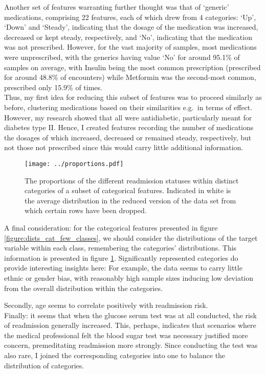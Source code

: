 \documentclass[10pt, twoside, a4paper]{article}
\begin{document}
	Another set of features warranting further thought was that of `generic' medications,
	comprising 22 features, each of which drew from 4 categories:
	`Up', `Down' and `Steady', indicating that the dosage of the medication was increased, 
	decreased or kept steady, respectively, and `No', indicating 
	that the medication was not prescribed. However, for
	the vast majority of samples, most medications were unprescribed, with the generics 
	having value `No' for around 95.1\% of samples on average, with Insulin being the most 
	common prescription (prescribed for around 48.8\% of encounters) while Metformin was 
	the second-most common, prescribed only 15.9\% of times. \\
	Thus, my first idea for reducing this subset of features was to proceed similarly 
	as before, clustering medications based on their similarities e.g.\ in terms of effect. 
	However, my research showed that all were antidiabetic, particularly meant for diabetes type II. 
	Hence, I created features recording the number of medications the dosages of 
	which increased, decreased or remained steady, respectively, but not those not prescribed 
	since this would carry little additional information.
	
	\begin{figure}
		\texttt{[image: ../proportions.pdf]}
		\caption{The proportions of the different readmission statuses within distinct 
		categories of a subset of categorical features. Indicated in white is the average 
		distribution in the reduced version of the data set from which certain rows have 
		been dropped.}
		\label{figure:readm_props}
	\end{figure}
	A final consideration: for the 
	categorical features presented in figure \ref{figure:dists_cat_few_classes}, we should 
	consider the distributions of the target variable within each class, remembering the 
	categories' distributions. This information is 
	presented in figure \ref{figure:readm_props}. Significantly represented categories 
	do provide interesting insights here: For example, the data seems to carry 
	little ethnic or gender bias, with reasonably high sample sizes inducing low 
	deviation from the overall distribution within the categories. 

	Secondly, age seems to correlate positively with readmission risk. 
	\\
	Finally: it seems that when the glucose serum 
	test was at all conducted, the risk of readmission generally increased. This, 
	perhaps, indicates that scenarios where the medical professional felt the blood sugar 
	test was necessary justified more concern, premeditating readmission more strongly. 
	Since conducting the test was also rare, I
	joined the corresponding categories into one to balance the distribution of 
	categories.
\end{document}
